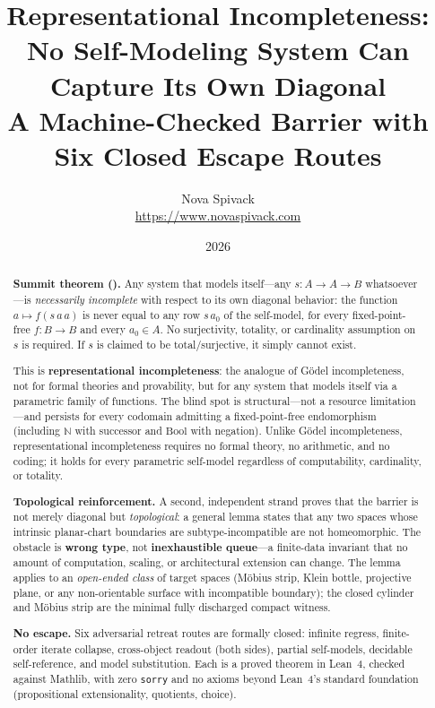 \documentclass[11pt]{article}
\title{Representational Incompleteness:\\
  No Self-Modeling System Can Capture Its Own Diagonal\\[0.3em]
  {\large A Machine-Checked Barrier with Six Closed Escape Routes}}
\author{Nova Spivack\\
\url{https://www.novaspivack.com}}
\date{2026}
\begin{document}
\maketitle
\NovaZenodoAfterTitle


\begin{abstract}
\raggedright
\noindent\textbf{Summit theorem ().}
Any system that models itself---any $s : A \to A \to B$ whatsoever---is
\emph{necessarily incomplete} with respect to its own diagonal behavior:
the function $a \mapsto f(s\,a\,a)$ is never equal to any row $s\,a_0$
of the self-model, for every fixed-point-free $f : B \to B$ and every
$a_0 \in A$.  No surjectivity, totality, or cardinality assumption on
$s$ is required.  If $s$ is claimed to be total/surjective, it simply
cannot exist.

This is \textbf{representational incompleteness}: the analogue of
G\"odel incompleteness, not for formal theories and provability, but
for any system that models itself via a parametric family of functions.
The blind spot is structural---not a resource limitation---and
persists for every codomain admitting a fixed-point-free endomorphism
(including $\mathbb{N}$ with successor and $\mathrm{Bool}$ with
negation).
Unlike G\"odel incompleteness, representational incompleteness
requires no formal theory, no arithmetic, and no coding; it holds for
every parametric self-model regardless of computability, cardinality,
or totality.

\medskip
\noindent\textbf{Topological reinforcement.}
A second, independent strand proves that the barrier is not merely
diagonal but \emph{topological}: a general lemma states that any two
spaces whose intrinsic planar-chart boundaries are subtype-incompatible
are not homeomorphic.  The obstacle is \textbf{wrong type}, not
\textbf{inexhaustible queue}---a finite-data invariant that no amount
of computation, scaling, or architectural extension can change.  The
lemma applies to an \emph{open-ended class} of target spaces (M\"obius
strip, Klein bottle, projective plane, or any non-orientable surface
with incompatible boundary); the closed cylinder and M\"obius strip are
the minimal fully discharged compact witness.

\medskip
\noindent\textbf{No escape.}
Six adversarial retreat routes are formally closed: infinite regress,
finite-order iterate collapse, cross-object readout (both sides),
partial self-models, decidable self-reference, and model substitution.
Each is a proved theorem in Lean~4, checked against Mathlib, with zero
\texttt{sorry} and no axioms beyond Lean~4's standard foundation
(propositional extensionality, quotients, choice).


\end{abstract}
\end{document}
